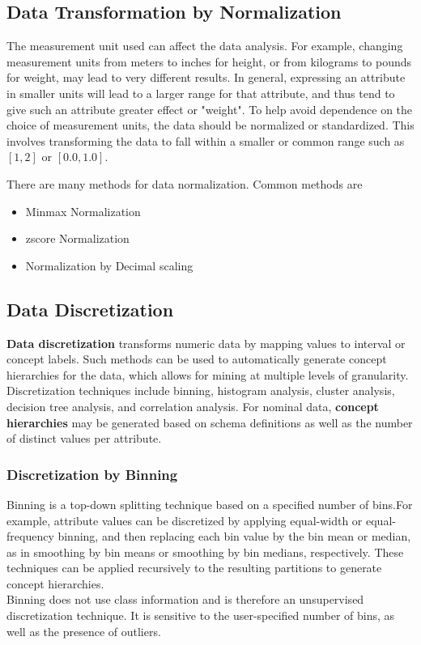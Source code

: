 \subsection{Data Transformation by Normalization}
The measurement unit used can affect the data analysis. For example, changing measurement units from meters
to inches for height, or from kilograms to pounds for weight, may lead to very different results. In general,
expressing an attribute in smaller units will lead to a larger range for that attribute, and thus tend to give such
an attribute greater effect or "weight". To help avoid dependence on the choice of measurement units, the data
should be normalized or standardized. This involves transforming the data to fall within a smaller or common
range such as $[1, 2]$ or $[0.0, 1.0]$.

There are many methods for data normalization. Common methods are 
\begin{itemize}
\item Min\-max Normalization
\item  z\-score Normalization
\item Normalization by Decimal scaling
\end{itemize} 

\subsection{Data Discretization}
\textbf{Data discretization} transforms numeric data by mapping values to interval or concept labels. Such
methods can be used to automatically generate concept hierarchies for the data, which allows for mining at
multiple levels of granularity. Discretization techniques include binning, histogram analysis, cluster analysis,
decision tree analysis, and correlation analysis. For nominal data,\textbf{ concept hierarchies} may be generated
based on schema definitions as well as the number of distinct values per attribute.

\subsubsection{Discretization by Binning}
Binning is a top-down splitting technique based on a specified number of bins.For example, attribute values can be discretized by applying equal-width or equal-frequency binning, and then replacing each bin value by the bin mean or
median, as in smoothing by bin means or smoothing by bin medians, respectively. These techniques can be
applied recursively to the resulting partitions to generate concept hierarchies.\\
Binning does not use class information and is therefore an unsupervised discretization technique. It is sensitive
to the user-specified number of bins, as well as the presence of outliers.



